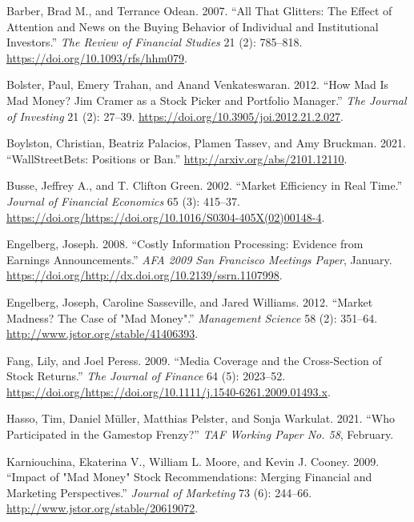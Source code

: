 \documentclass[12pt,]{article}
\begin{document}
\leavevmode\hypertarget{ref-barber2007}{}%
Barber, Brad M., and Terrance Odean. 2007. ``All That Glitters: The
Effect of Attention and News on the Buying Behavior of Individual and
Institutional Investors.'' \emph{The Review of Financial Studies} 21
(2): 785--818. \url{https://doi.org/10.1093/rfs/hhm079}.

\leavevmode\hypertarget{ref-bolster2012}{}%
Bolster, Paul, Emery Trahan, and Anand Venkateswaran. 2012. ``How Mad Is
Mad Money? Jim Cramer as a Stock Picker and Portfolio Manager.''
\emph{The Journal of Investing} 21 (2): 27--39.
\url{https://doi.org/10.3905/joi.2012.21.2.027}.

\leavevmode\hypertarget{ref-boylston2021}{}%
Boylston, Christian, Beatriz Palacios, Plamen Tassev, and Amy Bruckman.
2021. ``WallStreetBets: Positions or Ban.''
\url{http://arxiv.org/abs/2101.12110}.

\leavevmode\hypertarget{ref-busse2002}{}%
Busse, Jeffrey A., and T. Clifton Green. 2002. ``Market Efficiency in
Real Time.'' \emph{Journal of Financial Economics} 65 (3): 415--37.
\url{https://doi.org/https://doi.org/10.1016/S0304-405X(02)00148-4}.

\leavevmode\hypertarget{ref-engelberg2008}{}%
Engelberg, Joseph. 2008. ``Costly Information Processing: Evidence from
Earnings Announcements.'' \emph{AFA 2009 San Francisco Meetings Paper},
January.
\href{https://doi.org/http://dx.doi.org/10.2139/ssrn.1107998\%20}{https://doi.org/http://dx.doi.org/10.2139/ssrn.1107998}.

\leavevmode\hypertarget{ref-engelberg2012}{}%
Engelberg, Joseph, Caroline Sasseville, and Jared Williams. 2012.
``Market Madness? The Case of "Mad Money".'' \emph{Management Science}
58 (2): 351--64. \url{http://www.jstor.org/stable/41406393}.

\leavevmode\hypertarget{ref-fang2009}{}%
Fang, Lily, and Joel Peress. 2009. ``Media Coverage and the
Cross-Section of Stock Returns.'' \emph{The Journal of Finance} 64 (5):
2023--52.
\url{https://doi.org/https://doi.org/10.1111/j.1540-6261.2009.01493.x}.

\leavevmode\hypertarget{ref-hasso2021}{}%
Hasso, Tim, Daniel Müller, Matthias Pelster, and Sonja Warkulat. 2021.
``Who Participated in the Gamestop Frenzy?'' \emph{TAF Working Paper No.
58}, February.

\leavevmode\hypertarget{ref-karniouchina2009}{}%
Karniouchina, Ekaterina V., William L. Moore, and Kevin J. Cooney. 2009.
``Impact of "Mad Money" Stock Recommendations: Merging Financial and
Marketing Perspectives.'' \emph{Journal of Marketing} 73 (6): 244--66.
\url{http://www.jstor.org/stable/20619072}.
\end{document}
